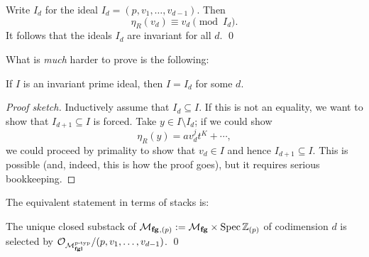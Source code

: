 \begin{corollary}
Write $I_d$ for the ideal $I_d = (p, v_1, \ldots, v_{d-1})$.  Then \[\eta_R(v_d) \equiv v_d \pmod{I_d}.\]  It follows that the ideals $I_d$ are invariant  for all $d$. \qed
\end{corollary}

\noindent What is \emph{much} harder to prove is the following:


\begin{theorem}
If $I$ is an invariant prime ideal, then $I = I_d$ for some $d$.
\end{theorem}
\begin{proof}[Proof sketch]
Inductively assume that $I_d \subseteq I$.   If this is not an equality, we want to show that $I_{d+1} \subseteq I$ is forced.  Take $y \in I \setminus I_d$; if we could show \[\eta_R(y) = a v_d^j t^K + \cdots, \]  we could proceed by primality to show that $v_d \in I$ and hence $I_{d+1} \subseteq I$.  This is possible (and, indeed, this is how the proof goes), but it requires serious bookkeeping.
\end{proof}

The equivalent statement in terms of stacks is:

\begin{theorem}[Landweber]\label{LandwebersClassificationOfClosedSubstacks}
The unique closed substack of $\mathcal{M}_{\mathbf{fg}}{}_{,(p)}:= \mathcal{M}_{\mathbf{fg}} \times \operatorname{Spec} \mathbb Z_{(p)}$ of codimension $d$ is selected by $\mathcal{O}_{\mathcal{M}_{\mathbf{fgl}}^{p\text{-}\mathrm{typ}}} / (p, v_1, \ldots, v_{d-1})$. \qed
\end{theorem}

